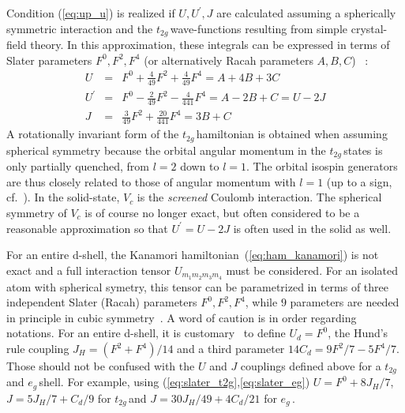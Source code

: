 \documentclass[]{ar2e-changed}%
\def\Up{U^\prime}
\def\ttg{$t_{2g}\,$}
\def\eg{$e_{g}\,$}
\begin{document}
Condition (\ref{eq:up_u}) is realized if $U,\Up,J$ are calculated assuming a spherically symmetric interaction and the 
\ttg wave-functions resulting from simple crystal-field theory. In this approximation, these integrals can be 
expressed in terms of Slater parameters $F^0,F^2,F^4$ (or alternatively Racah parameters $A,B,C$)~\cite{sugano_multiplets_book} : 
\begin{eqnarray}
U&=&F^0+\frac{4}{49}F^2+\frac{4}{49}F^4=A+4B+3C \nonumber\\
U^\prime&=&F^0-\frac{2}{49}F^2-\frac{4}{441}F^4=A-2B+C=U-2J\nonumber\\
J&=&\frac{3}{49}F^2+\frac{20}{441}F^4=3B+C
\label{eq:slater_t2g}
\end{eqnarray}
%
A rotationally invariant form of the \ttg hamiltonian is obtained when assuming spherical symmetry 
because the orbital angular momentum in the \ttg states is 
only partially quenched, from $l=2$ down to $l=1$. The orbital isospin generators are thus closely related 
to those of angular momentum with $l=1$ (up to a sign, cf.~\cite{sugano_multiplets_book}). 
%
In the solid-state, $V_c$ is the {\it screened} Coulomb interaction. The spherical symmetry of $V_c$ 
is of course no longer exact, but often considered to be a reasonable approximation so that 
$U^\prime=U-2J$ is often used in the solid as well. 

For an entire d-shell, the Kanamori hamiltonian~(\ref{eq:ham_kanamori}) is not exact and a full 
interaction tensor $U_{m_1m_2m_3m_4}$ must be considered. For an isolated atom with spherical 
symetry, this tensor can be parametrized in terms of three independent Slater (Racah) parameters 
$F^0,F^2,F^4$, while $9$ parameters are needed in principle in cubic 
symmetry~\cite{sugano_multiplets_book}. 
%
%
%
A word of caution is in order regarding notations. For an entire d-shell, 
it is customary~\cite{vandermarel_sawatzky_prb_1988,vandermarel_phd_1985,haverkort_phd_2005} 
to define 
$U_d=F^0$, the Hund's rule coupling $J_H=(F^2+F^4)/14$ and a third parameter 
$14C_d=9F^2/7-5F^4/7$. Those should not be confused with the $U$ and $J$ couplings defined 
above for a \ttg and \eg shell. For example, using (\ref{eq:slater_t2g},\ref{eq:slater_eg}) 
$U=F^0+8 J_H/7$, 
$J=5J_H/7+C_d/9 $ for \ttg and $J=30 J_H/49+4C_d/21$ for \eg.
\end{document}
